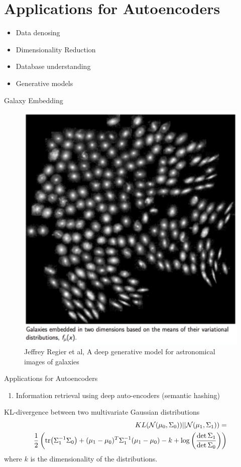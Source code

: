 \documentclass[xcolor=pdftex,dvipsnames,table,mathserif]{beamer}
\begin{document}
\section{Applications for Autoencoders}

\begin{frame}
\begin{itemize}
\item Data denosing
\item Dimensionality Reduction
\item Database understanding
\item Generative models
\end{itemize}
\end{frame}

\begin{frame}{Galaxy Embedding}
\begin{figure}
\includegraphics[width=.5\columnwidth]{../graphics/GalaxyEmbedding}
\caption{Jeffrey Regier et al, A deep generative model for astronomical images of galaxies}
\end{figure}
\end{frame}
\begin{frame}{Applications for Autoencoders}
\begin{enumerate}
\item Information retrieval using deep auto-encoders (semantic hashing)
\end{enumerate}
\end{frame}

\begin{frame}{KL-divergence between two multivariate Gaussian distributions}
\begin{eqnarray*}
KL(\mathcal{N}(\mu_0,\Sigma_0)) || \mathcal{N}(\mu_1,\Sigma_1))=\\
 \frac{1}{2} \left ( \tr (\Sigma_1^{-1}\Sigma_0)+(\mu_1-\mu_0)^T \Sigma_1^{-1}(\mu_1-\mu_0)-k+\log \left ( \frac{\det \Sigma_1}{\det \Sigma_0}\right )\right )
\end{eqnarray*}
where $k$ is the dimensionality of the distributions.
\end{frame}
\end{document}
